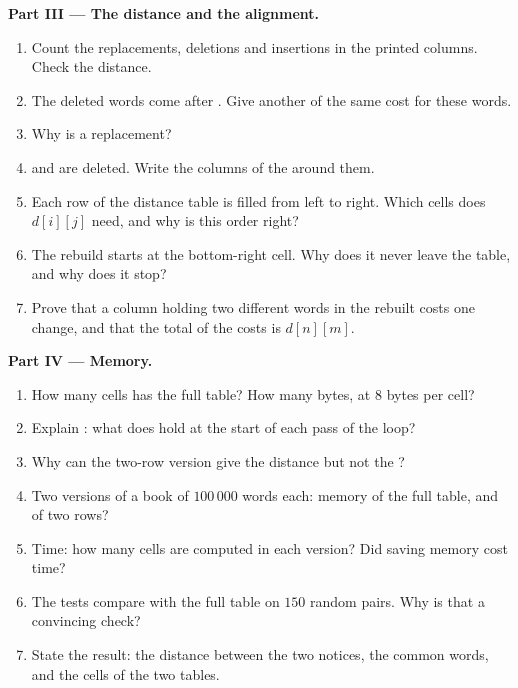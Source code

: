 \begin{problem}
\medskip\noindent\textbf{Part III --- The distance and the alignment.}
\begin{enumerate}[resume]
  \item Count the replacements, deletions and insertions in the printed columns. Check the distance.
  \item The deleted words  come after . Give another  of the same
    cost for these words.
  \item Why is  a replacement?
  \item {} and  are deleted. Write the columns of the  around them.
  \item Each row of the distance table is filled from left to right. Which cells does $d[i][j]$ need, and why is this
    order right?
  \item The rebuild starts at the bottom-right cell. Why does it never leave the table, and why does it stop?
  \item Prove that a column holding two different words in the rebuilt  costs one change, and that the
    total of the costs is $d[n][m]$.
\end{enumerate}

\medskip\noindent\textbf{Part IV --- Memory.}
\begin{enumerate}[resume]
  \item How many cells has the full table? How many bytes, at $8$ bytes per cell?
  \item Explain : what does  hold at the start of each pass of the loop?
  \item Why can the two-row version give the distance but not the ?
  \item Two versions of a book of $100\,000$ words each: memory of the full table, and of two rows?
  \item Time: how many cells are computed in each version? Did saving memory cost time?
  \item The tests compare  with the full table on $150$ random pairs. Why is that a
    convincing check?
  \item State the result: the distance between the two notices, the common words, and the cells of the two tables.
\end{enumerate}
\end{problem}
